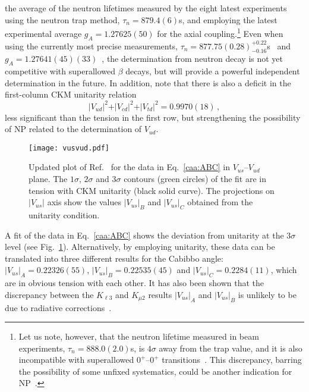 \documentclass[10pt]{article}
\begin{document}
the average of the neutron lifetimes measured by the eight latest experiments using the neutron trap method,  $\tau_n = 879.4(6)$s, and employing the latest experimental average $g_A=1.27625(50)$ for the axial coupling.\footnote{Let us note, however, that the neutron lifetime  measured in beam experiments, $\tau_n=888.0(2.0)$s, is $4\sigma$ away from the trap value, and it is also incompatible with superallowed $0^+$--$0^+$ transitions~\cite{Czarnecki:2018okw}. This discrepancy, barring the possibility of some unfixed systematics, could be another indication for NP~\cite{Fornal:2018eol,Berezhiani:2018eds,Grinstein:2018ptl,Berezhiani:2018udo}.} Even when using the currently most precise measurements, $\tau_n =  877.75(0.28)^{+0.22}_{-0.16}$s~\cite{UCNt:2021pcg} and $g_A=1.27641(45)(33)$~\cite{Markisch:2018ndu}, the determination from neutron decay is not yet competitive with superallowed $\beta$ decays, but will provide a powerful independent determination in the future. In addition, note that there is also a deficit in the first-column CKM unitarity relation
\begin{equation}
\vert V_{ud} \vert^2 + \vert V_{cd} \vert^2 + \vert V_{td} \vert^2 = 0.9970(18)  \,,
\end{equation}
less significant than the tension in the first row, but strengthening the possibility of NP related to the determination of $V_{ud}$.
%
\begin{figure}
\centering
\texttt{[image: vusvud.pdf]}
\caption{Updated plot of Ref.~\cite{Belfatto:2019swo} for the data in Eq.~\eqref{caa:ABC} in $V_{us}$--$V_{ud}$ plane. The $1\sigma$, $2\sigma$ and $3\sigma$ contours (green circles) of the fit are in tension with CKM unitarity (black solid curve). The projections on $\vert V_{us}\vert$ axis show the values $\vert V_{us}\vert_B$ and $\vert V_{us}\vert_C$ obtained from the unitarity condition.}
\label{caa:vusvud}
\end{figure}

A fit of the data in Eq.~\eqref{caa:ABC} shows the deviation from unitarity at the $3\sigma$ level (see Fig.~\ref{caa:vusvud}). Alternatively, by employing unitarity, these data can be translated into three different results for the Cabibbo angle: 
$\vert V_{us} \vert_A = 0.22326(55)$, $\vert V_{us}\vert_B= 0.22535(45)$ and $\vert V_{us}\vert_C= 0.2284(11)$, which are in obvious tension with each other. It has also been shown that the discrepancy between the $K_{\ell3}$ and $K_{\mu2}$ results 
$\vert V_{us} \vert_A$ and $\vert V_{us} \vert_B$ is unlikely to be due to radiative corrections~\cite{Seng:2021wcf,DiCarlo:2019thl}. 
\end{document}
